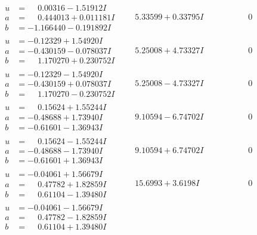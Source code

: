 \documentclass[1p]{elsarticle_modified}
\theoremstyle{definition}
\begin{document}
$$\begin{array}{c|c|c}
\begin{aligned}
u &= \phantom{-}0.00316 - 1.51912 I \\
a &= \phantom{-}0.444013 + 0.011181 I \\
b &= -1.166440 - 0.191892 I\end{aligned}
 & \phantom{-}5.33599 + 0.33795 I & \phantom{-0.000000 } 0 \\ \hline\begin{aligned}
u &= -0.12329 + 1.54920 I \\
a &= -0.430159 - 0.078037 I \\
b &= \phantom{-}1.170270 + 0.230752 I\end{aligned}
 & \phantom{-}5.25008 + 4.73327 I & \phantom{-0.000000 } 0 \\ \hline\begin{aligned}
u &= -0.12329 - 1.54920 I \\
a &= -0.430159 + 0.078037 I \\
b &= \phantom{-}1.170270 - 0.230752 I\end{aligned}
 & \phantom{-}5.25008 - 4.73327 I & \phantom{-0.000000 } 0 \\ \hline\begin{aligned}
u &= \phantom{-}0.15624 + 1.55244 I \\
a &= -0.48688 + 1.73940 I \\
b &= -0.61601 - 1.36943 I\end{aligned}
 & \phantom{-}9.10594 - 6.74702 I & \phantom{-0.000000 } 0 \\ \hline\begin{aligned}
u &= \phantom{-}0.15624 - 1.55244 I \\
a &= -0.48688 - 1.73940 I \\
b &= -0.61601 + 1.36943 I\end{aligned}
 & \phantom{-}9.10594 + 6.74702 I & \phantom{-0.000000 } 0 \\ \hline\begin{aligned}
u &= -0.04061 + 1.56679 I \\
a &= \phantom{-}0.47782 + 1.82859 I \\
b &= \phantom{-}0.61104 - 1.39480 I\end{aligned}
 & \phantom{-}15.6993 + 3.6198 I & \phantom{-0.000000 } 0 \\ \hline\begin{aligned}
u &= -0.04061 - 1.56679 I \\
a &= \phantom{-}0.47782 - 1.82859 I \\
b &= \phantom{-}0.61104 + 1.39480 I\end{aligned}

\end{array}$$
\end{document}
